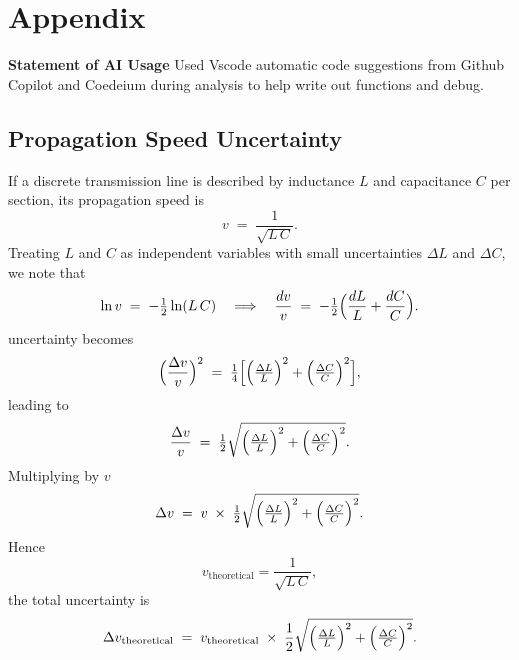 \documentclass[
	a4paper, %
	10pt, %
	twoside, %
]{journal}
\begin{document}

\printbibliography %



\newpage

\appendix
\section*{Appendix}
\renewcommand{\thesubsection}{\Roman{subsection}}
\textbf{Statement of AI Usage} Used Vscode automatic code suggestions from Github Copilot and Coedeium during analysis to help write out functions and debug. 

\subsection{Propagation Speed Uncertainty}
\label{appendix:propagation-speed-uncertainty}
If a discrete transmission line is described by inductance $L$ and capacitance $C$ per section, 
its propagation speed is 
\[
v \;=\; \frac{1}{\sqrt{L\,C}}.
\]
Treating $L$ and $C$ as independent variables with small uncertainties $\Delta L$ and $\Delta C$, 
we note that 
\[
\ln v 
\;=\; 
-\tfrac12 \ln(L\,C)
\quad\Longrightarrow\quad
\frac{d v}{v} 
\;=\; 
-\tfrac12 
\Bigl(
\frac{dL}{L} 
+ 
\frac{dC}{C}
\Bigr).
\]
uncertainty becomes
\[
\Bigl(\frac{\Delta v}{v}\Bigr)^2
\;=\;
\tfrac{1}{4}
\Bigl[
\Bigl(\tfrac{\Delta L}{L}\Bigr)^2
+
\Bigl(\tfrac{\Delta C}{C}\Bigr)^2
\Bigr],
\]
leading to
\[
\frac{\Delta v}{v}
\;=\;
\tfrac12
\sqrt{
\Bigl(\tfrac{\Delta L}{L}\Bigr)^2
+
\Bigl(\tfrac{\Delta C}{C}\Bigr)^2
}.
\]
Multiplying by $v$ 
\[
\Delta v
\;=\;
v \;\times\;
\tfrac12
\sqrt{
\Bigl(\tfrac{\Delta L}{L}\Bigr)^2
+
\Bigl(\tfrac{\Delta C}{C}\Bigr)^2
}.
\]
Hence 
\[
v_{\mathrm{theoretical}} = \frac{1}{\sqrt{L\,C}},
\]
the total uncertainty is 
\[
\Delta v_{\mathrm{theoretical}}
\;=\;
v_{\mathrm{theoretical}}
\;\times\;
\frac12
\sqrt{
\Bigl(\tfrac{\Delta L}{L}\Bigr)^2
+
\Bigl(\tfrac{\Delta C}{C}\Bigr)^2
}.
\]
\end{document}
